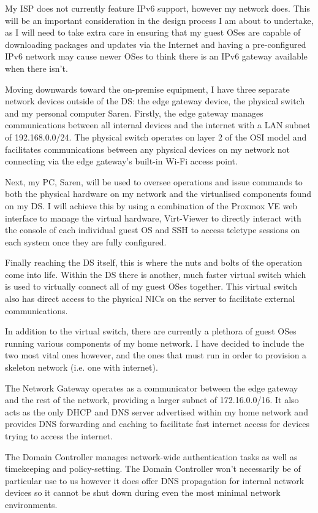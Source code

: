 My ISP does not currently feature IPv6 support, however my network does. This will be an important consideration in the design process I am about to undertake, as I will need to take extra care in ensuring that my guest OSes are capable of downloading packages and updates via the Internet and having a pre-configured IPv6 network may cause newer OSes to think there is an IPv6 gateway available when there isn't.

Moving downwards toward the on-premise equipment, I have three separate network devices outside of the DS: the edge gateway device, the physical switch and my personal computer Saren. Firstly, the edge gateway manages communications between all internal devices and the internet with a LAN subnet of 192.168.0.0/24. The physical switch operates on layer 2 of the OSI model \cite{day_et_al_1983} and facilitates communications between any physical devices on my network not connecting via the edge gateway's built-in Wi-Fi access point.

Next, my PC, Saren, will be used to oversee operations and issue commands to both the physical hardware on my network and the virtualised components found on my DS. I will achieve this by using a combination of the Proxmox VE web interface to manage the virtual hardware, Virt-Viewer to directly interact with the console of each individual guest OS and SSH to access teletype sessions on each system once they are fully configured.

Finally reaching the DS itself, this is where the nuts and bolts of the operation come into life. Within the DS there is another, much faster virtual switch which is used to virtually connect all of my guest OSes together. This virtual switch also has direct access to the physical NICs on the server to facilitate external communications.

In addition to the virtual switch, there are currently a plethora of guest OSes running various components of my home network. I have decided to include the two most vital ones however, and the ones that must run in order to provision a skeleton network (i.e. one with internet).

The Network Gateway operates as a communicator between the edge gateway and the rest of the network, providing a larger subnet of 172.16.0.0/16. It also acts as the only DHCP and DNS server advertised within my home network and provides DNS forwarding and caching to facilitate fast internet access for devices trying to access the internet.

The Domain Controller manages network-wide authentication tasks as well as timekeeping and policy-setting. The Domain Controller won't necessarily be of particular use to us however it does offer DNS propagation for internal network devices so it cannot be shut down during even the most minimal network environments.

